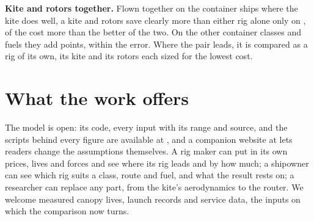 \documentclass[10pt,a4paper]{article}
\begin{document}

\textbf{Kite and rotors together.} Flown together on the container ships where the kite does well, a kite and rotors save clearly more than either rig alone only on \NumCombinationLeading{}, \NumCombinationBestGain{} of the cost more than the better of the two. On the other container classes and fuels they add \NumCombinationOtherGains{} points, within the error. Where the pair leads, it is compared as a rig of its own, its kite and its rotors each sized for the lowest cost.

\section{What the work offers}

The model is open: its code, every input with its range and source, and the scripts behind every figure are available at \urlof{\repository}, and a companion website at \urlof{\website} lets readers change the assumptions themselves. A rig maker can put in its own prices, lives and forces and see where its rig leads and by how much; a shipowner can see which rig suits a class, route and fuel, and what the result rests on; a researcher can replace any part, from the kite's aerodynamics to the router. We welcome measured canopy lives, launch records and service data, the inputs on which the comparison now turns.



\end{document}
